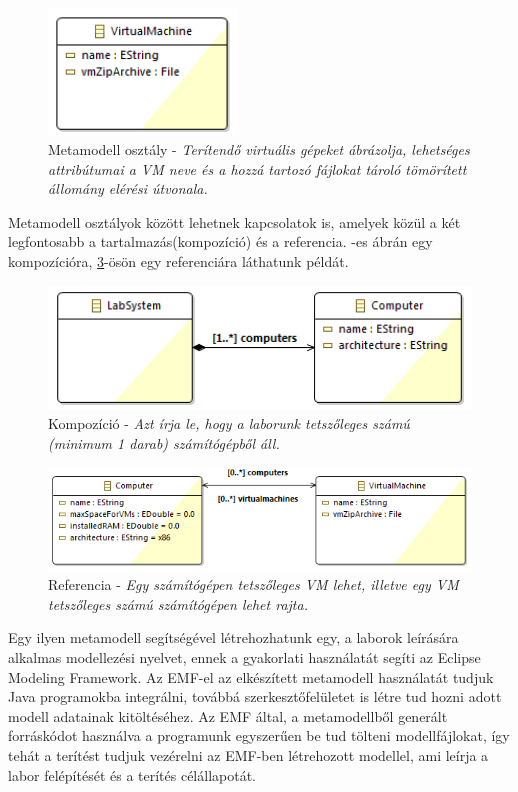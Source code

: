 \begin{figure}[ht]
	\centering
	\includegraphics[width=50mm, keepaspectratio]{figures/binf_emf_1.png}
	\caption{Metamodell osztály - \textit{Terítendő virtuális gépeket ábrázolja, lehetséges attribútumai a VM neve és a hozzá tartozó fájlokat tároló tömörített állomány elérési útvonala.}}
	\label{fig:emfobj}
\end{figure}

Metamodell osztályok között lehetnek kapcsolatok is, amelyek közül a két legfontosabb a tartalmazás(kompozíció) és a referencia. -es ábrán egy kompozícióra, \ref{fig:emfref}-ösön egy referenciára láthatunk példát.

\begin{figure}[ht!]
	\centering
	\includegraphics[width=115mm, keepaspectratio]{figures/binf_emf_2.png}
	\caption{Kompozíció - \textit{Azt írja le, hogy a laborunk tetszőleges számú (minimum 1 darab) számítógépből áll.}}
	\label{fig:emfcomp}
\end{figure}

\begin{figure}[ht!]
	\centering
	\includegraphics[width=150mm, keepaspectratio]{figures/binf_emf_3.png}
	\caption{Referencia - \textit{Egy számítógépen tetszőleges VM lehet, illetve egy VM tetszőleges számú számítógépen lehet rajta.}}
	\label{fig:emfref}
\end{figure}


Egy ilyen metamodell segítségével létrehozhatunk egy, a laborok leírására alkalmas modellezési nyelvet, ennek a gyakorlati használatát segíti az Eclipse Modeling Framework\cite{steinberg2008emf}. Az EMF-el az elkészített metamodell használatát tudjuk Java programokba integrálni, továbbá szerkesztőfelületet is létre tud hozni adott modell adatainak kitöltéséhez. Az EMF által, a metamodellből generált forráskódot használva a programunk egyszerűen be tud tölteni modellfájlokat, így tehát a terítést tudjuk vezérelni az EMF-ben létrehozott modellel, ami leírja a labor felépítését és a terítés célállapotát.